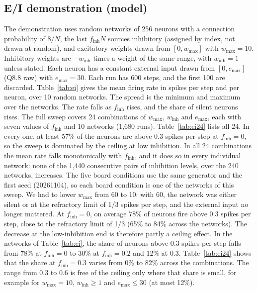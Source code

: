 \documentclass[11pt]{article}
\begin{document}
\subsection{E/I demonstration (model)}
\label{sec:ei}
The demonstration uses random networks of 256 neurons with a connection probability of $8/N$, the last $f_{\mathrm{inh}}N$ sources inhibitory (assigned by index, not drawn at random), and excitatory weights drawn from $[0, w_{\max}]$ with $w_{\max}=10$. Inhibitory weights are $-w_{\mathrm{inh}}$ times a weight of the same range, with $w_{\mathrm{inh}}=1$ unless stated.
Each neuron has a constant external input drawn from $[0, e_{\max}]$ (Q8.8 raw) with $e_{\max}=30$. Each run has 600 steps, and the first 100 are discarded.
Table~\ref{tab:ei} gives the mean firing rate in spikes per step and per neuron, over 10 random networks. The spread is the minimum and maximum over the networks.
The rate falls as $f_{\mathrm{inh}}$ rises, and the share of silent neurons rises.
The full sweep covers 24 combinations of $w_{\max}$, $w_{\mathrm{inh}}$ and $e_{\max}$, each with seven values of $f_{\mathrm{inh}}$ and 10 networks (1,680 runs). Table~\ref{tab:ei24} lists all 24. In every one, at least 57\% of the neurons are above 0.3 spikes per step at $f_{\mathrm{inh}}=0$, so the sweep is dominated by the ceiling at low inhibition.
In all 24 combinations the mean rate falls monotonically with $f_{\mathrm{inh}}$, and it does so in every individual network: none of the 1,440 consecutive pairs of inhibition levels, over the 240 networks, increases.
The five board conditions use the same generator and the first seed (20261104), so each board condition is one of the networks of this sweep.
We had to lower $w_{\max}$ from 60 to 10: with 60, the network was either silent or at the refractory limit of 1/3 spikes per step, and the external input no longer mattered.
At $f_{\mathrm{inh}}=0$, on average 78\% of neurons fire above 0.3 spikes per step, close to the refractory limit of 1/3 (65\% to 84\% across the networks). The decrease at the low-inhibition end is therefore partly a ceiling effect. In the networks of Table~\ref{tab:ei}, the share of neurons above 0.3 spikes per step falls from 78\% at $f_{\mathrm{inh}}=0$ to 30\% at $f_{\mathrm{inh}}=0.2$ and 12\% at $0.3$. Table~\ref{tab:ei24} shows that the share at $f_{\mathrm{inh}}=0.3$ varies from 0\% to 82\% across the combinations. The range from 0.3 to 0.6 is free of the ceiling only where that share is small, for example for $w_{\max}=10$, $w_{\mathrm{inh}}\geq 1$ and $e_{\max}\leq 30$ (at most 12\%).
\end{document}
